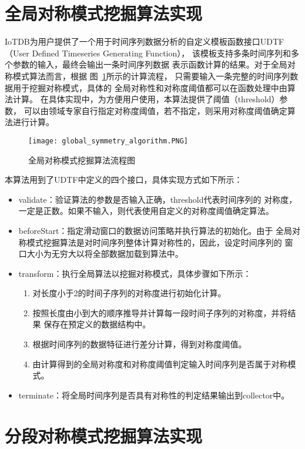 \section{全局对称模式挖掘算法实现}
IoTDB为用户提供了一个用于时间序列数据分析的自定义模板函数接口UDTF
（User Defined Timeseries Generating Function），
该模板支持多条时间序列和多个参数的输入，最终会输出一条时间序列数据
表示函数计算的结果。对于全局对称模式算法而言，根据
图~\ref{fig:global_algorithm_process}所示的计算流程，
只需要输入一条完整的时间序列数据用于挖掘对称模式，具体的
全局对称性和对称度阈值都可以在函数处理中由算法计算。
在具体实现中，为方便用户使用，本算法提供了阈值（threshold）参数，
可以由领域专家自行指定对称度阈值，若不指定，则采用对称度阈值确定算法进行计算。
\begin{figure}
    \centering
    \texttt{[image: global\_symmetry\_algorithm.PNG]}
    \caption{全局对称模式挖掘算法流程图}
    \label{fig:global_algorithm_process}
\end{figure}

本算法用到了UDTF中定义的四个接口，具体实现方式如下所示：
\begin{itemize}
\item validate：验证算法的参数是否输入正确，threshold代表时间序列的
      对称度，一定是正数。如果不输入，则代表使用自定义的对称度阈值确定算法。
\item beforeStart：指定滑动窗口的数据访问策略并执行算法的初始化。由于
      全局对称模式挖掘算法是对时间序列整体计算对称性的，因此，设定时间序列的
      窗口大小为无穷大以将全部数据加载到算法中。
\item transform：执行全局算法以挖掘对称模式，具体步骤如下所示：
    \begin{enumerate}
        \item 对长度小于2的时间子序列的对称度进行初始化计算。
        \item 按照长度由小到大的顺序推导并计算每一段时间子序列的对称度，并将结果
              保存在预定义的数据结构中。
        \item 根据时间序列的数据特征进行差分计算，得到对称度阈值。
        \item 由计算得到的全局对称度和对称度阈值判定输入时间序列是否属于对称模式。
    \end{enumerate}
\item terminate：将全局时间序列是否具有对称性的判定结果输出到collector中。
\end{itemize}

\section{分段对称模式挖掘算法实现}

